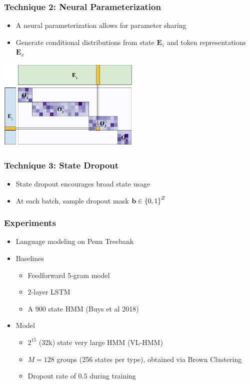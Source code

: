 \documentclass{beamer}
\begin{document}
\begin{frame}
\frametitle{Technique 2: Neural Parameterization}
\begin{itemize}
\item A neural parameterization allows for parameter sharing
\item Generate conditional distributions from
state $\mathbf{E}_z$ and token representations $\mathbf{E}_x$
\end{itemize}
\begin{center}
\includegraphics[height=1.7in]{img/blocksparse_mat_no_block.pdf}
\end{center}
\end{frame}

\begin{frame}
\frametitle{Technique 3: State Dropout}
\begin{itemize}
\item State dropout encourages broad state usage
\item At each batch, sample dropout mask $\mathbf{b} \in \left\{0,1\right\}^{Z}$
\end{itemize}
\begin{center}
\resizebox{0.75\width}{0.75\height}{

}
\end{center}
\end{frame}

\begin{frame}
\frametitle{Experiments}
\begin{itemize}
\item Language modeling on Penn Treebank
\vspace{1em}
\item Baselines
    \begin{itemize}
    \item Feedforward 5-gram model
    \item 2-layer LSTM
    \item A 900 state HMM (Buys et al 2018)
    \end{itemize}
\vspace{1em}
\item Model
    \begin{itemize}
    \item $2^{15}$ (32k) state very large HMM (VL-HMM)
    \item $M=128$ groups (256 states per type), obtained via Brown Clustering
    \item Dropout rate of $0.5$ during training
    \end{itemize}
\end{itemize}
\end{frame}
\end{document}
